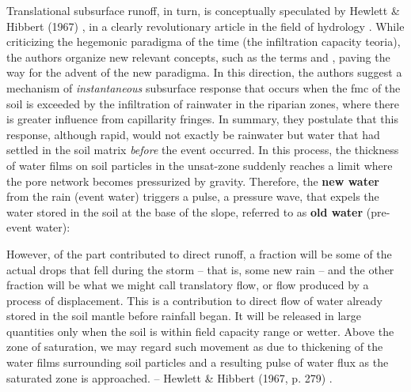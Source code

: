 \documentclass[./main_en.tex]{subfiles}
\begin{document}
\par Translational subsurface runoff, in turn, is conceptually speculated by Hewlett \& Hibbert (1967) \cite{Hewlett1967}, in a clearly revolutionary article in the field of \gls{hydrology} \cite{McDonnell2009}. While criticizing the hegemonic \gls{paradigma} of the time (the infiltration capacity \gls{teoria}), the authors organize new relevant concepts, such as the terms  and , paving the way for the advent of the new \gls{paradigma}. In this direction, the authors suggest a mechanism of \textit{instantaneous} subsurface response that occurs when the \gls{fmc} of the soil is exceeded by the infiltration of rainwater in the riparian zones, where there is greater influence from capillarity fringes. In summary, they postulate that this response, although rapid, would not exactly be rainwater but water that had settled in the soil matrix \textit{before} the event occurred. In this process, the thickness of water films on soil particles in the \gls{unsat-zone} suddenly reaches a limit where the pore network becomes pressurized by gravity. Therefore, the \textbf{new water} from the rain (event water) triggers a pulse, a pressure wave, that expels the water stored in the soil at the base of the slope, referred to as \textbf{old water} (pre-event water):

\begin{adjustwidth}{100pt}{0pt}
\medskip
\small
However, of the part contributed to direct runoff, a fraction will be some of the actual drops that fell during the storm -- that is, some new rain -- and the other fraction will be what we might call translatory flow, or flow produced by a process of displacement. This is a contribution to direct flow of water already stored in the soil mantle before rainfall began. It will be released in large quantities only when the soil is within field capacity range or wetter. Above the zone of saturation, we may regard such movement as due to thickening of the water films surrounding soil particles and a resulting pulse of water flux as the saturated zone is approached. -- Hewlett \& Hibbert (1967, p. 279) \cite{Hewlett1967}.
\medskip
\end{adjustwidth}
\end{document}
